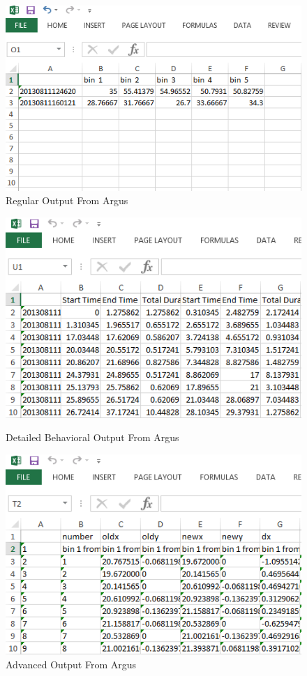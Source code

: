 \documentclass[12pt,titlepage]{report}
\begin{document}
\begin{figure}[ht!]
\centering
\includegraphics[width=130mm]{image15.png}
\caption{Regular Output From Argus}
\end{figure}
\pagebreak
\begin{figure}
\includegraphics[width=130mm]{image16.png}
\caption{Detailed Behavioral Output From Argus}
\includegraphics[width=130mm]{image17.png}
\caption{Advanced Output From Argus}
\label{overflow}
\end{figure}
\end{document}
